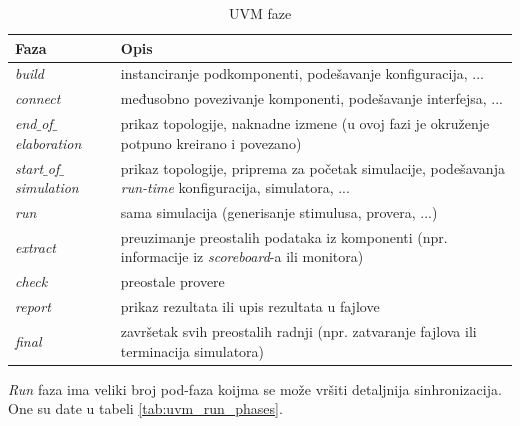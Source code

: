 \begin{table}[h!]
  \centering
  \begin{tabular}{|p{}|p{}|}
    \hline
    \textbf{Faza} & \textbf{Opis} \\
    \hline
    \emph{build} & instanciranje podkomponenti, podešavanje konfiguracija, ...\\
    \hline
    \emph{connect} & međusobno povezivanje komponenti, podešavanje interfejsa, ...\\
    \hline
    \emph{end\(\_\)of\(\_\)elaboration} & prikaz topologije, naknadne izmene (u ovoj fazi je okruženje potpuno kreirano i povezano)\\
    \hline
    \emph{start\(\_\)of\(\_\)simulation} & prikaz topologije, priprema za početak simulacije, podešavanja \emph{run-time} konfiguracija, simulatora, ...\\
    \hline
    \emph{run} & sama simulacija (generisanje stimulusa, provera, ...)\\
    \hline
    \emph{extract} & preuzimanje preostalih podataka iz komponenti (npr. informacije iz \emph{scoreboard}-a ili monitora)\\
    \hline
    \emph{check} & preostale provere\\
    \hline
    \emph{report} & prikaz rezultata ili upis rezultata u fajlove\\
    \hline
    \emph{final} & završetak svih preostalih radnji (npr. zatvaranje fajlova ili terminacija simulatora)\\
    \hline
  \end{tabular}
  \caption{UVM faze}
  \label{tab:uvm_phases}
\end{table}

\emph{Run} faza ima veliki broj pod-faza koijma se može vršiti detaljnija
sinhronizacija. One su date u tabeli \ref{tab:uvm_run_phases}.\\

